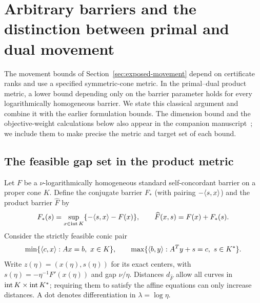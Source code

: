 \section{Arbitrary barriers and the distinction between primal and dual movement}
\label{sec:pd-movement}

The movement bounds of Section~\ref{sec:exposed-movement} depend on
certificate ranks and use a specified symmetric-cone metric. In the
primal--dual product metric, a lower bound depending
only on the barrier parameter holds for every logarithmically
homogeneous barrier. We state this classical argument and combine it
with the earlier formulation bounds. The dimension bound and the
objective-weight calculations below also appear in the companion
manuscript~\cite[Sections~5, 9, and~10]{CentralPathCompanion}; we
include them to make precise the metric and target set of each bound.

\subsection{The feasible gap set in the product metric}
Let $F$ be a $\nu$-logarithmically homogeneous standard self-concordant
barrier on a proper cone $K$. Define the conjugate barrier $F_*$ (with
pairing $-\langle s,x\rangle$) and the product barrier $\widehat F$ by
\[
 F_*(s)=\sup_{x\in\operatorname{int} K}\{-\langle s,x\rangle-F(x)\},\qquad
 \widehat F(x,s)=F(x)+F_*(s).
\]
Consider the strictly feasible conic pair
\[
 \min\{\langle c,x\rangle:Ax=b,\ x\in K\},\qquad
 \max\{\langle b,y\rangle:A^Ty+s=c,\ s\in K^*\}.
\]
Write $z(\eta)=(x(\eta),s(\eta))$ for its exact centers, with
$s(\eta)=-\eta^{-1}F'(x(\eta))$ and gap $\nu/\eta$.
Distances $d_{\widehat F}$ allow all curves in $\operatorname{int} K\times\operatorname{int} K^*$;
requiring them to satisfy the affine equations can only increase
distances. A dot denotes differentiation in $\lambda=\log\eta$.

